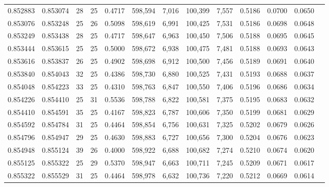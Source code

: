 \begin{tabular}{rrrrrrrrrrrrr}
0.852883 & 0.853074 &    28 &  25 &                                     0.4717 & 598,594 &   7,016 & 100,399 &   7,557 & 0.5186 & 0.0700 & 0.0650 \\
0.853076 & 0.853248 &    25 &  26 &                                     0.5098 & 598,619 &   6,991 & 100,425 &   7,531 & 0.5186 & 0.0698 & 0.0648 \\
0.853249 & 0.853438 &    28 &  25 &                                     0.4717 & 598,647 &   6,963 & 100,450 &   7,506 & 0.5188 & 0.0695 & 0.0645 \\
0.853444 & 0.853615 &    25 &  25 &                                     0.5000 & 598,672 &   6,938 & 100,475 &   7,481 & 0.5188 & 0.0693 & 0.0643 \\
0.853616 & 0.853837 &    26 &  25 &                                     0.4902 & 598,698 &   6,912 & 100,500 &   7,456 & 0.5189 & 0.0691 & 0.0640 \\
0.853840 & 0.854043 &    32 &  25 &                                     0.4386 & 598,730 &   6,880 & 100,525 &   7,431 & 0.5193 & 0.0688 & 0.0637 \\
0.854048 & 0.854223 &    33 &  25 &                                     0.4310 & 598,763 &   6,847 & 100,550 &   7,406 & 0.5196 & 0.0686 & 0.0634 \\
0.854226 & 0.854410 &    25 &  31 &                                     0.5536 & 598,788 &   6,822 & 100,581 &   7,375 & 0.5195 & 0.0683 & 0.0632 \\
0.854410 & 0.854591 &    35 &  25 &                                     0.4167 & 598,823 &   6,787 & 100,606 &   7,350 & 0.5199 & 0.0681 & 0.0629 \\
0.854592 & 0.854784 &    31 &  25 &                                     0.4464 & 598,854 &   6,756 & 100,631 &   7,325 & 0.5202 & 0.0679 & 0.0626 \\
0.854796 & 0.854947 &    29 &  25 &                                     0.4630 & 598,883 &   6,727 & 100,656 &   7,300 & 0.5204 & 0.0676 & 0.0623 \\
0.854948 & 0.855124 &    39 &  26 &                                     0.4000 & 598,922 &   6,688 & 100,682 &   7,274 & 0.5210 & 0.0674 & 0.0620 \\
0.855125 & 0.855322 &    25 &  29 &                                     0.5370 & 598,947 &   6,663 & 100,711 &   7,245 & 0.5209 & 0.0671 & 0.0617 \\
0.855322 & 0.855529 &    31 &  25 &                                     0.4464 & 598,978 &   6,632 & 100,736 &   7,220 & 0.5212 & 0.0669 & 0.0614 \\

\end{tabular}
